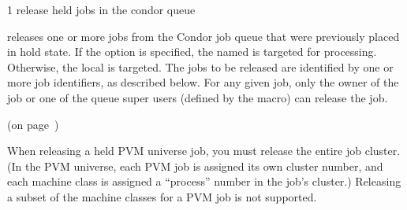 \begin{ManPage}{\label{man-condor-release}}{1}
{release held jobs in the condor queue}
\Synopsis {}


\Description

 releases one or more jobs from the Condor job queue that were 
previously placed in hold state.  
If the  option is specified, the named  is targeted
for processing.  
Otherwise, the local  is targeted.
The jobs to be released are identified by one or more job identifiers, as
described below.
For any given job, only the owner of the job or one of the queue super users
(defined by the  macro) can release the job.

\begin{Options}
\end{Options}

\SeeAlso
{} (on page~\pageref{man-condor-hold})

\GenRem

When releasing a held PVM universe job, you must release the entire
job cluster.  (In the PVM universe, each PVM job is assigned its own
cluster number, and each machine class is assigned a ``process''
number in the job's cluster.)  Releasing a subset of the machine
classes for a PVM job is not supported.

\end{ManPage}
